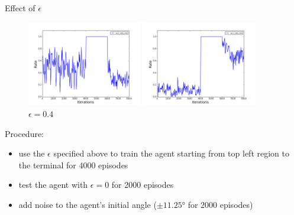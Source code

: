 \documentclass{beamer}
\begin{document}
\begin{frame}{Effect of $\epsilon$}
\begin{figure}
    \centering
    \begin{minipage}{5cm}
    \includegraphics[width=5cm]{0_1_vari_theta.png}
    \caption{$\epsilon = 0.1$}
    \end{minipage}
    \begin{minipage}{5cm}
    \includegraphics[width=5cm]{0_4_vari_theta.png}
    \caption{$\epsilon = 0.4$}
    \end{minipage}
\end{figure} 

\footnotesize{
Procedure:
\begin{itemize}
	\item {use the $\epsilon$ specified above to train the agent starting from top left region to the terminal for 4000 episodes}
	\item {test the agent with $\epsilon = 0$ for 2000 episodes}
	\item {add noise to the agent's initial angle ($\pm11.25\si{\degree}$ for 2000 episodes)}
\end{itemize}

}

\end{frame}
\end{document}
